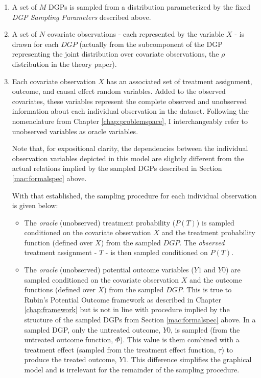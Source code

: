 \documentclass[../main.tex]{subfiles}
\begin{document}
\begin{enumerate}

\item A set of $M$ DGPs is sampled from a distribution parameterized by the fixed \textit{DGP Sampling Parameters} described above.

\item A set of $N$ covariate observations - each represented by the variable $X$ - is drawn for each $DGP$ (actually from the subcomponent of the DGP representing the joint distribution over covariate observations, the $\rho$ distribution in the theory paper).

\item Each covariate observation $X$ has an associated set of treatment assignment, outcome, and causal effect random variables. Added to the observed covariates, these variables represent the complete observed and unobserved information about each individual observation in the dataset. Following the nomenclature from Chapter \ref{chap:problemspace}, I interchangeably refer to unobserved variables as oracle variables.

\vspace{\baselineskip}

Note that, for expositional clarity, the dependencies between the individual observation variables depicted in this model are slightly different from the actual relations implied by the sampled DGPs described in Section \ref{mac:formalspec} above.

\vspace{\baselineskip}

With that established, the sampling procedure for each individual observation is given below:

\begin{itemize}
    \item The \textit{oracle} (unobserved) treatment probability ($P(T)$) is sampled conditioned on the covariate observation $X$ and the treatment probability function (defined over $X$) from the sampled $DGP$. The \textit{observed} treatment assignment - $T$ - is then sampled conditioned on $P(T)$.

    \item The \textit{oracle} (unobserved) potential outcome variables ($Y1$ and $Y0$) are sampled conditioned on the covariate observation $X$ and the outcome functions (defined over $X$) from the sampled $DGP$. This is true to Rubin's Potential Outcome framework as described in Chapter \ref{chap:framework} but is not in line with procedure implied by the structure of the sampled DGPs from Section \ref{mac:formalspec} above. In a sampled DGP, only the untreated outcome, $Y0$, is sampled (from the untreated outcome function, $\Phi$). This value is them combined with a treatment effect (sampled from the treatment effect function, $\tau$) to produce the treated outcome, $Y1$. This difference simplifies the graphical model and is irrelevant for the remainder of the sampling procedure.


\end{itemize}
\end{enumerate}
\end{document}
